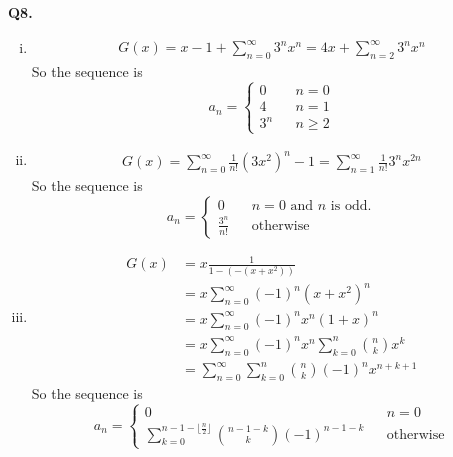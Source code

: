 \documentclass{article}[12pt]
\begin{document}
\noindent \textbf{Q8.}
\begin{enumerate}[(i)]
\item 
\begin{align*}
G(x)=x-1+\sum_{n=0}^{\infty}3^nx^n=4x+\sum_{n=2}^{\infty}3^nx^n
\end{align*}
So the sequence is 
\begin{equation*}
a_n=\left\{
\begin{array}{lcl}
0 & & {n=0}\\
4 & & {n=1}\\
3^n & & {n\geq 2}
\end{array} \right.
\end{equation*}
\item 
\begin{align*}
G(x)=\sum_{n=0}^{\infty}\frac{1}{n!} (3x^2)^n-1=\sum_{n=1}^{\infty}\frac{1}{n!} 3^nx^{2n}
\end{align*}
So the sequence is 
\begin{equation*}
a_n=\left\{
\begin{array}{lcl}
0 & & {n=0\text{ and }n\text{ is odd.} }\\
\frac{3^n}{n!} & & {\text{otherwise}}
\end{array} \right.
\end{equation*}
\item 
\begin{align*}
G(x)&=x\frac{1}{1-(-(x+x^2))}\\
&=x\sum_{n=0}^{\infty}(-1)^n(x+x^2)^n\\
&=x\sum_{n=0}^{\infty}(-1)^nx^n(1+x)^n\\
&=x\sum_{n=0}^{\infty}(-1)^n x^n \sum_{k=0}^{n}\binom{n}{k}x^k\\
&=\sum_{n=0}^{\infty} \sum_{k=0}^{n}\binom{n}{k}(-1)^n x^{n+k+1}
\end{align*}
So the sequence is 
\begin{equation*}
a_n=\left\{
\begin{array}{lcl}
0 & & {n=0}\\
\sum_{k=0}^{n-1-\lfloor \frac{n}{2}\rfloor}\binom{n-1-k}{k}(-1)^{n-1-k} & & {\text{otherwise}}
\end{array} \right.
\end{equation*}
\end{enumerate}
\end{document}
